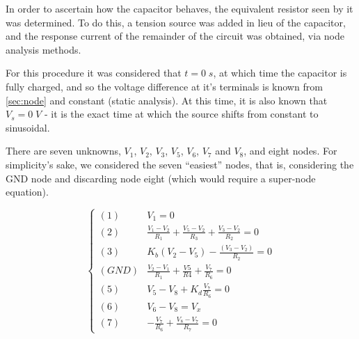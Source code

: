In order to ascertain how the capacitor behaves, the equivalent resistor seen by it was determined. To do this, a tension source was added in lieu of the capacitor, and the response current of the remainder of the circuit was obtained, via node analysis methods.

For this procedure it was considered that $t=0\;s$, at which time the capacitor is fully charged, and so the voltage difference at it's terminals is known from \ref{sec:node} and constant (static analysis). At this time, it is also known that $V_s=0\;V$ - it is the exact time at which the source shifts from constant to sinusoidal.


There are seven unknowns, $V_1$, $V_2$, $V_3$, $V_5$, $V_6$, $V_7$ and $V_8$, and eight nodes. For simplicity's sake, we considered the seven ``easiest'' nodes, that is, considering the GND node and discarding node eight (which would require a super-node equation).

\begin{equation}
  \begin{cases}
    (1) & V_1=0 \\
    (2) & \frac{V_1-V_2}{R_1} + \frac{V_5-V_2}{R_3} + \frac{V_3-V_2}{R_2} = 0 \\
    (3) & K_b (V_2-V_5)-\frac{(V_3-V_2)}{R_2} = 0 \\
    (GND) & \frac{V_2-V_1}{R_1} + \frac{V5}{R4} + \frac{V_7}{R_6} = 0 \\
    (5) & V_5-V_8 + K_d \frac{V_7}{R_6} = 0 \\
    (6) & V_6-V_8 = V_x \\
    (7) & -\frac{V_7}{R_6} + \frac{V_8-V_7}{R_7} = 0
  \end{cases}
\end{equation}

